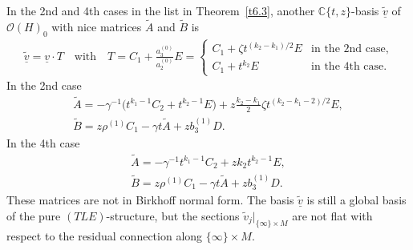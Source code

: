 \documentclass[pdftex]{sigma}%
\numberwithin{equation}{section}
\numberwithin{figure}{section}
\newcommand{\C}{{\mathbb C}}
\newcommand{\OO}{{\mathcal O}}
\newcommand{\www}{\widetilde}
\newcommand{\uuuu}{\underline}
\begin{document}
\begin{Remark}\label{t6.6}
In the 2nd and 4th cases in the list in Theorem~\ref{t6.3},
another $\C\{t,z\}$-basis $\uuuu{\www v}$
of~$\OO(H)_0$ with nice matrices $\www A$ and $\www B$
is
\begin{gather*}%
\uuuu{\www v}=\uuuu{v}\cdot T\quad\text{with}\quad
T=C_1+\frac{a_3^{(0)}}{a_2^{(0)}}E
=\begin{cases}
C_1+\zeta t^{(k_2-k_1)/2}E & \text{in the 2nd case,}\\
C_1+t^{k_2}E & \text{in the 4th case.}
\end{cases}
\end{gather*}
In the 2nd case
\begin{gather*}%
\www A= -\gamma^{-1}\big(t^{k_1-1}C_2 + t^{k_2-1}E\big) + z\frac{k_2-k_1}{2}\zeta t^{(k_2-k_1-2)/2}E,
\\
\www B= z\rho^{(1)} C_1 -\gamma t\www A +
z b_3^{(1)} D.\nonumber
\end{gather*}
In the 4th case
\begin{gather*}%
\www A= -\gamma^{-1}t^{k_1-1}C_2 + zk_2t^{k_2-1}E,\\
\www B= z\rho^{(1)} C_1 -\gamma t\www A +z b_3^{(1)} D.\nonumber
\end{gather*}
These matrices are not in Birkhoff normal form.
The basis $\uuuu{\www v}$ is still a global basis
of the pure $(TLE)$-structure, but
the sections $\www v_j|_{\{\infty\}\times M}$ are not
flat with respect to the residual connection along
$\{\infty\}\times M$.
\end{Remark}
\end{document}
